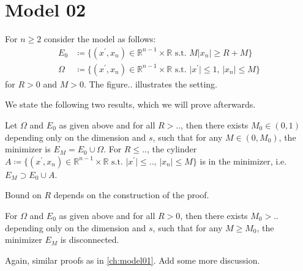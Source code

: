 \chapter{Model 02}
\label{ch:model02}

For \( n \geq 2 \) consider the model as follows:
\begin{align}
	E_0    & \coloneqq \{(x^\prime,x_n) \in \mathbb{R}^{n-1} \times \mathbb{R} \text{ s.t. } M \lvert x_n \rvert \geq R+M \} \\
	\Omega & \coloneqq \{(x^\prime,x_n) \in \mathbb{R}^{n-1} \times \mathbb{R} \text{ s.t. } \lvert x^\prime \rvert \leq 1, \, \lvert x_n \rvert \leq M \}
\end{align}
for \( R > 0 \) and \( M > 0 \). The figure.. illustrates the setting.


We state the following two results, which we will prove afterwards.

\begin{theorem}
	\label{thm:301}
	Let \( \Omega \) and \( E_0 \) as given above and for all \( R >.. \), then there
	exists \( M_0 \in (0,1) \) depending only on the dimension and \( s \), such that
	for any \( M \in (0, M_0) \), the minimizer is \( E_M = E_0 \cup \Omega \). For \( R
	\leq.. \), the cylinder \( A \coloneqq \{(x^\prime,x_n) \in \mathbb{R}^{n-1} \times
	\mathbb{R} \text{ s.t.~} \lvert x^\prime \rvert \leq.., \, \lvert x_n \rvert \leq M
	\} \) is in the minimizer, i.e.\ \( E_M \supset E_0 \cup A \).
\end{theorem}
\begin{note}
	Bound on \( R \) depends on the construction of the proof.
\end{note}

\begin{theorem}
	\label{thm:302}
	For \( \Omega \) and \( E_0 \) as given above and for all \( R > 0 \), then there
	exists \( M_0 >.. \) depending only on the dimension and \( s \), such that
	for any \( M \geq M_0 \), the minimizer \( E_M \) is disconnected.
\end{theorem}

Again, similar proofs as in \cref{ch:model01}.\newline
Add some more discussion. 

